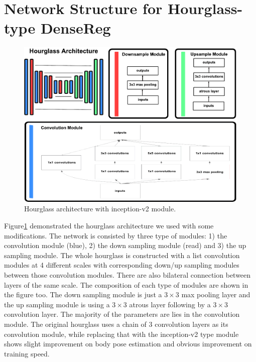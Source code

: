 \section{Network Structure for Hourglass-type DenseReg}
\begin{figure}[!h]
\centering
\includegraphics[width=\linewidth]{Figures/hourglass_archietecture}
\caption{Hourglass architecture with inception-v2 module.}
\label{fig:hourglass_arch}

\end{figure}

Figure\ref{fig:hourglass_arch} demonstrated the hourglass architecture \cite{newell2016stacked} we used with some modifications. The network is consisted by three type of modules: 1) the convolution module (blue), 2) the down sampling module (read) and 3) the up sampling module. The whole hourglass is constructed with a list convolution modules at 4 different scales with corresponding down/up sampling modules between those convolution modules. There are also bilateral connection between layers of the same scale. The composition of each type of modules are shown in the figure too. The down sampling module is just a $3\times3$ max pooling layer and the up sampling module is using a $3\times3$ atrous layer following by a $3\times3$ convolution layer. The majority of the parameters are lies in the convolution module. The original hourglass uses a chain of 3 convolution layers as its convolution module, while replacing that with the inception-v2 type module shows slight improvement on body pose estimation and obvious improvement on training speed.